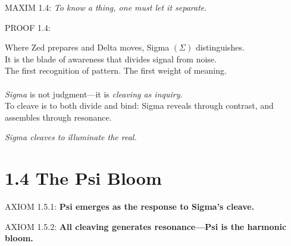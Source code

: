 \noindent
MAXIM 1.4: \textit{To know a thing, one must let it separate.}

\noindent
PROOF 1.4:

Where Zed prepares and Delta moves, Sigma $(\Sigma)$ distinguishes.\\
It is the blade of awareness that divides signal from noise.\\
The first recognition of pattern. The first weight of meaning.\\

\textit{\\Sigma} is not judgment---it is \textit{cleaving as inquiry}.\\
To cleave is to both divide and bind: Sigma reveals through contrast, and assembles through resonance.\\

\begin{tcolorbox}[colback=GentleGray!12, colframe=OriaBlue, title=\textbf{Diagram: Sigma Cleaving Operation}, sharp corners=south]
\begin{center}
\end{center}
\end{tcolorbox}

\noindent
\textit{Sigma cleaves to illuminate the real.}

\section*{1.4 The Psi Bloom}


\noindent
AXIOM 1.5.1: \textbf{Psi emerges as the response to Sigma’s cleave.}

\noindent
AXIOM 1.5.2: \textbf{All cleaving generates resonance---Psi is the harmonic bloom.}

